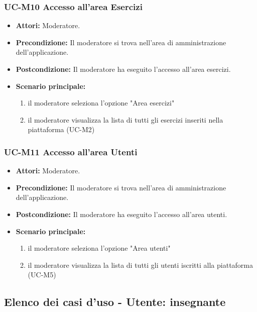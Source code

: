 \subsubsection{UC-M10 Accesso all'area Esercizi}
\begin{itemize}
	\item \textbf{Attori:} Moderatore.
	\item \textbf{Precondizione:} Il moderatore si trova nell'area di amministrazione dell'applicazione.
	\item \textbf{Postcondizione:} Il moderatore ha eseguito l'accesso all'area esercizi.
	\item \textbf{Scenario principale:}
	\begin{enumerate}
		\item il moderatore seleziona l'opzione "Area esercizi"
		\item il moderatore visualizza la lista di tutti gli esercizi inseriti nella piattaforma (UC-M2)
	\end{enumerate}
\end{itemize}

\subsubsection{UC-M11 Accesso all'area Utenti}
\begin{itemize}
	\item \textbf{Attori:} Moderatore.
	\item \textbf{Precondizione:} Il moderatore si trova nell'area di amministrazione dell'applicazione.
	\item \textbf{Postcondizione:} Il moderatore ha eseguito l'accesso all'area utenti.
	\item \textbf{Scenario principale:}
	\begin{enumerate}
		\item il moderatore seleziona l'opzione "Area utenti"
		\item il moderatore visualizza la lista di tutti gli utenti iscritti alla piattaforma (UC-M5)
	\end{enumerate}
\end{itemize}

\subsection{Elenco dei casi d'uso - Utente: insegnante}		
